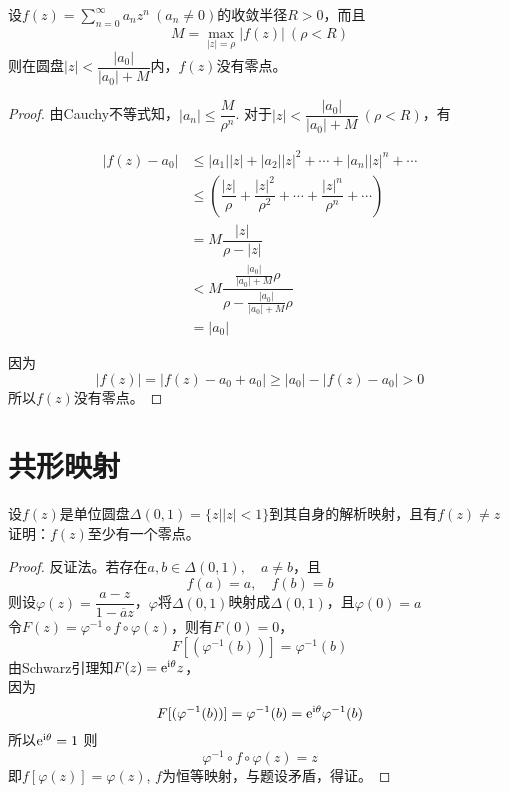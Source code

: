 \begin{proposition}

    设$f(z) = \sum\limits_{n = 0}^{\infty}{a_n z^n} \ (a_n \neq 0)$的收敛半径$R > 0$，而且
    $$M = \max_{|z| = \rho}{|f(z)|}\ (\rho < R)$$
    则在圆盘$|z| < \dfrac{|a_0|}{|a_0| + M}$内，$f(z)$没有零点。

\end{proposition}

\begin{proof}

    由\textup{Cauchy}不等式知，$|a_n| \leq \dfrac{M}{\rho^n}$. 对于$|z| < \dfrac{|a_0|}{|a_0| + M}\ (\rho < R)$，有

    \begin{align*}
        |f(z) - a_0| & \leq |a_1||z| + |a_2||z|^2 + \cdots + |a_n||z|^n + \cdots \\
        & \leq \left( \dfrac{|z|}{\rho} + \dfrac{|z|^2}{\rho^2} + \cdots + \dfrac{|z|^n}{\rho^n} + \cdots \right) \\
        & = M \dfrac{|z|}{\rho - |z|} \\
        & < M \dfrac{\frac{|a_0|}{|a_0| + M}\rho}{\rho - \frac{|a_0|}{|a_0| + M}\rho} \\
        & = |a_0|
    \end{align*}

    因为
    $$|f(z)| = |f(z) - a_0 + a_0| \geq |a_0| - |f(z) - a_0| > 0$$
    所以$f(z)$没有零点。

\end{proof}

\section{共形映射}

\begin{proposition}

    设$f(z)$是单位圆盘$\Delta(0, 1) = \{z \big| |z| < 1 \}$到其自身的解析映射，且有$f(z) \neq z$ \\
    证明：$f(z)$至少有一个零点。

\end{proposition}

\begin{proof}
    
    反证法。若存在$a, b \in \Delta(0, 1), \quad a \neq b$，且
    $$f(a) = a, \quad  f(b) = b$$
    则设$\varphi(z) = \dfrac{a - z}{1 - \overline{a}z}$，$\varphi$将$\Delta(0, 1)$映射成$\Delta(0, 1)$，且$\varphi(0) = a $ \\
    令$F(z) = \varphi^{-1} \circ f \circ \varphi(z)$，则有$F(0) = 0$，
    $$F[(\varphi^{-1}(b))] = \varphi^{-1}(b)$$
    由\textup{Schwarz}引理知$F(z) = \mathrm{e}^{\mathrm{i \theta}}z$，\\
    因为
    $$F[(\varphi^{-1}(b))] = \varphi^{-1}(b) = \mathrm{e}^{\mathrm{i \theta}}\varphi^{-1}(b)$$
    所以$ \mathrm{e}^{\mathrm{i \theta}} = 1$
    则
    $$ \varphi^{-1} \circ f \circ \varphi(z) = z$$
    即$ f[\varphi(z)] = \varphi(z)$, $f$为恒等映射，与题设矛盾，得证。

\end{proof}

